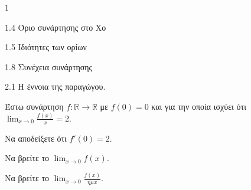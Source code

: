 \begin{ylh}{1}
    \item 1.4 Όριο συνάρτησης στο Χο
    \item 1.5 Ιδιότητες των ορίων
    \item 1.8 Συνέχεια συνάρτησης
    \item 2.1 Η έννοια της παραγώγου.
\end{ylh}
Έστω συνάρτηση $f: \mathbb{R} \to \mathbb{R}$ με $f(0)=0$ και για την οποία ισχύει ότι $\lim_{x \to 0} \frac{f(x)}{x} = 2$.
\begin{alist}
\item Να αποδείξετε ότι $f'(0) = 2$. 
\item Να βρείτε το $\lim_{x \to 0} f(x)$. 
\item Να βρείτε το $\lim_{x \to 0} \frac{f(x)}{\eta\mu x}$. 
\end{alist}